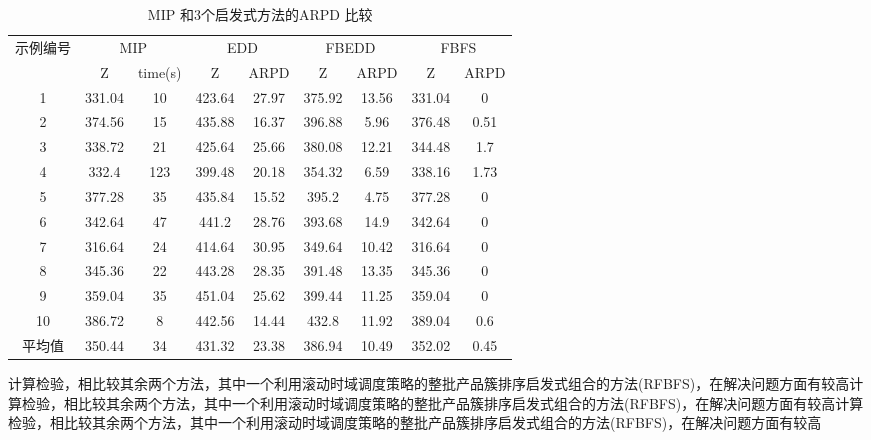 \begin{table}[h]
  \centering\xiaowu
  \caption{MIP 和3个启发式方法的ARPD 比较}
    \begin{tabular}{ccccccccc}
    \toprule
    \multirow{2}[4]{*}{示例编号} & \multicolumn{2}{c}{MIP} & \multicolumn{2}{c}{EDD} & \multicolumn{2}{c}{FBEDD} & \multicolumn{2}{c}{FBFS} \\
   \cline{2-9}
          & Z     & time(s) & Z     & ARPD  & Z     & ARPD  & Z     & ARPD \\
      \midrule
    1     & 331.04 & 10    & 423.64 & 27.97 & 375.92 & 13.56 & 331.04 & 0 \\
    2     & 374.56 & 15    & 435.88 & 16.37 & 396.88 & 5.96  & 376.48 & 0.51 \\
    3     & 338.72 & 21    & 425.64 & 25.66 & 380.08 & 12.21 & 344.48 & 1.7 \\
    4     & 332.4 & 123   & 399.48 & 20.18 & 354.32 & 6.59  & 338.16 & 1.73 \\
    5     & 377.28 & 35    & 435.84 & 15.52 & 395.2 & 4.75  & 377.28 & 0 \\
    6     & 342.64 & 47    & 441.2 & 28.76 & 393.68 & 14.9  & 342.64 & 0 \\
    7     & 316.64 & 24    & 414.64 & 30.95 & 349.64 & 10.42 & 316.64 & 0 \\
    8     & 345.36 & 22    & 443.28 & 28.35 & 391.48 & 13.35 & 345.36 & 0 \\
    9     & 359.04 & 35    & 451.04 & 25.62 & 399.44 & 11.25 & 359.04 & 0 \\
    10    & 386.72 & 8     & 442.56 & 14.44 & 432.8 & 11.92 & 389.04 & 0.6 \\[3pt]
    平均值   & 350.44 & 34    & 431.32 & 23.38 & 386.94 & 10.49 & 352.02 & 0.45 \\
    \bottomrule
    \end{tabular}
\end{table}

计算检验，相比较其余两个方法，其中一个利用滚动时域调度策略的整批产品簇排序启发式组合的方法(RFBFS)，在解决问题方面有较高计算检验，相比较其余两个方法，其中一个利用滚动时域调度策略的整批产品簇排序启发式组合的方法(RFBFS)，在解决问题方面有较高计算检验，相比较其余两个方法，其中一个利用滚动时域调度策略的整批产品簇排序启发式组合的方法(RFBFS)，在解决问题方面有较高
\begin{figure}[h]
\begin{floatrow}[2]
\centering
{}
\end{floatrow}
\end{figure}